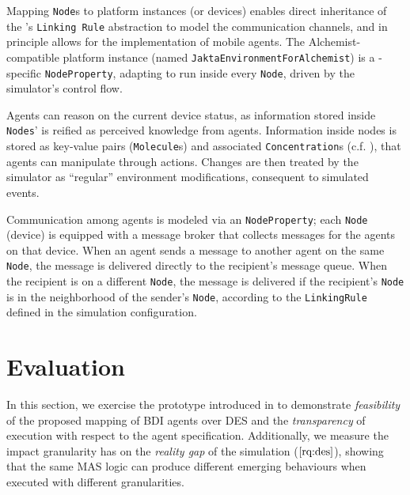 Mapping \texttt{Node}s to platform instances (or devices) enables direct inheritance of the
\alchemist{}'s \texttt{Linking Rule} abstraction to model the communication channels,
and in principle allows for the implementation of mobile agents.
%
The Alchemist-compatible platform instance (named \texttt{JaktaEnvironmentForAlchemist}) is a \jakta{}-specific \texttt{NodeProperty},
adapting \jakta{} to run inside every \alchemist{} \texttt{Node},
driven by the simulator's control flow.

Agents can reason on the current device status,
as information stored inside \texttt{Nodes}'
is reified as perceived knowledge from \jakta{} agents.
%
Information inside nodes is stored as key-value pairs
(\texttt{Molecule}s) and associated \texttt{Concentration}s (c.f. ),
that agents can manipulate through actions.
%
Changes are then treated by the simulator as ``regular''
environment modifications, consequent to simulated events.

Communication among agents is modeled via an \alchemist{} \texttt{NodeProperty};
each \texttt{Node} (device) is equipped with a message broker
that collects messages for the agents on that device.
%
When an agent sends a message to another agent on the same \texttt{Node},
the message is delivered directly to the recipient's message queue.
%
When the recipient is on a different \texttt{Node},
the message is delivered if the recipient's \texttt{Node} is in the neighborhood
of the sender's \texttt{Node},
according to the \texttt{LinkingRule} defined in the simulation configuration.

\section{Evaluation}\label{sec:simulation:evaluation}

In this section,
we exercise the prototype introduced in 
to demonstrate \emph{feasibility} of the proposed mapping of \ac{BDI} agents over \ac{DES}
and the \emph{transparency} of execution with respect to the agent specification.
%
Additionally,
we measure the impact granularity has on the \emph{reality gap} of the simulation ($\ref{rq:des}$),
showing that the same \ac{MAS} logic can produce different emerging behaviours
when executed with different granularities.

